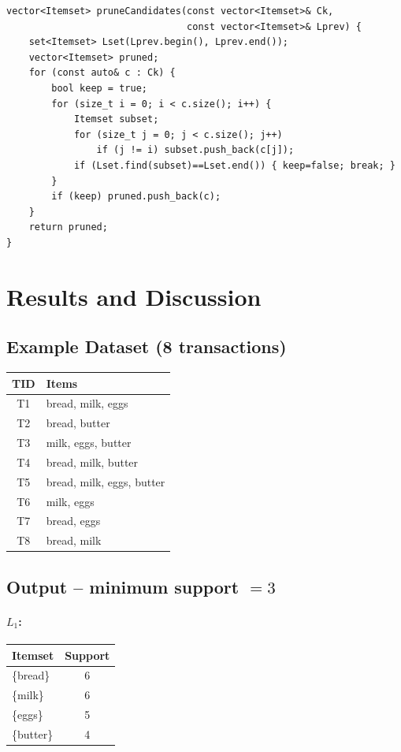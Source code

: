 \documentclass[11pt,a4paper]{article}
\begin{document}
\begin{lstlisting}[caption={Pruning -- Apriori property}]
vector<Itemset> pruneCandidates(const vector<Itemset>& Ck,
                                const vector<Itemset>& Lprev) {
    set<Itemset> Lset(Lprev.begin(), Lprev.end());
    vector<Itemset> pruned;
    for (const auto& c : Ck) {
        bool keep = true;
        for (size_t i = 0; i < c.size(); i++) {
            Itemset subset;
            for (size_t j = 0; j < c.size(); j++)
                if (j != i) subset.push_back(c[j]);
            if (Lset.find(subset)==Lset.end()) { keep=false; break; }
        }
        if (keep) pruned.push_back(c);
    }
    return pruned;
}
\end{lstlisting}

\section{Results and Discussion}

\subsection{Example Dataset (8 transactions)}

\begin{center}
\begin{tabular}{|c|l|}
\hline
\textbf{TID} & \textbf{Items} \\
\hline
T1 & bread, milk, eggs \\
T2 & bread, butter \\
T3 & milk, eggs, butter \\
T4 & bread, milk, butter \\
T5 & bread, milk, eggs, butter \\
T6 & milk, eggs \\
T7 & bread, eggs \\
T8 & bread, milk \\
\hline
\end{tabular}
\end{center}

\subsection{Output -- minimum support $= 3$}

\paragraph{$L_1$:}
\begin{center}
\begin{tabular}{|l|c|}
\hline
\textbf{Itemset} & \textbf{Support} \\
\hline
\{bread\}  & 6 \\
\{milk\}   & 6 \\
\{eggs\}   & 5 \\
\{butter\} & 4 \\
\hline
\end{tabular}
\end{center}
\end{document}
